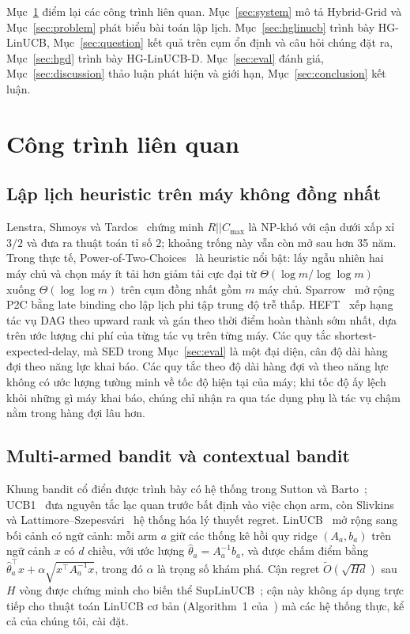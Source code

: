 \documentclass[final,5p,times,twocolumn]{elsarticle}
\begin{document}
Mục~\ref{sec:related} điểm lại các công trình liên quan. Mục~\ref{sec:system} mô tả Hybrid-Grid và Mục~\ref{sec:problem} phát biểu bài toán lập lịch. Mục~\ref{sec:hglinucb} trình bày HG-LinUCB, Mục~\ref{sec:question} kết quả trên cụm ổn định và câu hỏi chúng đặt ra, Mục~\ref{sec:hgd} trình bày HG-LinUCB-D. Mục~\ref{sec:eval} đánh giá, Mục~\ref{sec:discussion} thảo luận phát hiện và giới hạn, Mục~\ref{sec:conclusion} kết luận.

\section{Công trình liên quan}
\label{sec:related}

\subsection{Lập lịch heuristic trên máy không đồng nhất}

Lenstra, Shmoys và Tardos~\cite{lenstra1990} chứng minh $R||C_{\max}$ là NP-khó với cận dưới xấp xỉ $3/2$ và đưa ra thuật toán tỉ số $2$; khoảng trống này vẫn còn mở sau hơn 35 năm. Trong thực tế, Power-of-Two-Choices~\cite{mitzenmacher2001} là heuristic nổi bật: lấy ngẫu nhiên hai máy chủ và chọn máy ít tải hơn giảm tải cực đại từ $\Theta(\log m/\log\log m)$ xuống $\Theta(\log\log m)$ trên cụm đồng nhất gồm $m$ máy chủ. Sparrow~\cite{sparrow} mở rộng P2C bằng late binding cho lập lịch phi tập trung độ trễ thấp. HEFT~\cite{heft} xếp hạng tác vụ DAG theo upward rank và gán theo thời điểm hoàn thành sớm nhất, dựa trên ước lượng chi phí của từng tác vụ trên từng máy. Các quy tắc shortest-expected-delay, mà SED trong Mục~\ref{sec:eval} là một đại diện, cân độ dài hàng đợi theo năng lực khai báo. Các quy tắc theo độ dài hàng đợi và theo năng lực không có ước lượng tường minh về tốc độ hiện tại của máy; khi tốc độ ấy lệch khỏi những gì máy khai báo, chúng chỉ nhận ra qua tác dụng phụ là tác vụ chậm nằm trong hàng đợi lâu hơn.

\subsection{Multi-armed bandit và contextual bandit}

Khung bandit cổ điển được trình bày có hệ thống trong Sutton và Barto~\cite{sutton2018}; UCB1~\cite{auer2002} đưa nguyên tắc lạc quan trước bất định vào việc chọn arm, còn Slivkins~\cite{slivkins2019} và Lattimore--Szepesv\'ari~\cite{lattimore2020} hệ thống hóa lý thuyết regret. LinUCB~\cite{li2010} mở rộng sang bối cảnh có ngữ cảnh: mỗi arm $a$ giữ các thống kê hồi quy ridge $(A_a,b_a)$ trên ngữ cảnh $x$ có $d$ chiều, với ước lượng $\hat\theta_a=A_a^{-1}b_a$, và được chấm điểm bằng $\hat{\theta}_a^\top x+\alpha\sqrt{x^\top A_a^{-1}x}$, trong đó $\alpha$ là trọng số khám phá. Cận regret $\tilde{O}(\sqrt{Hd})$ sau $H$ vòng được chứng minh cho biến thể SupLinUCB~\cite{chu2011}; cận này không áp dụng trực tiếp cho thuật toán LinUCB cơ bản (Algorithm~1 của~\cite{li2010}) mà các hệ thống thực, kể cả của chúng tôi, cài đặt.
\end{document}
